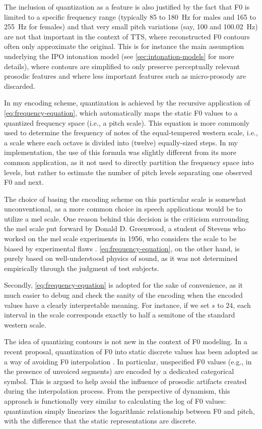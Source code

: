 The inclusion of quantization as a feature is also justified by the fact that \ac{F0} is limited to a specific frequency range (typically 85 to 180~Hz for males and 165 to 255~Hz for females) and that very small pitch variations (say, 100 and 100.02~Hz) are not that important in the context of \ac{TTS}, where reconstructed \ac{F0} contours often only approximate the original.
This is for instance the main assumption underlying the IPO intonation model (see \autoref{sec:intonation-models} for more details), where contours are simplified to only preserve perceptually relevant prosodic features and where less important features such as micro-prosody are discarded.

In my encoding scheme, quantization is achieved by the recursive application of \autoref{eq:frequency-equation}, which automatically maps the static \ac{F0} values to a quantized frequency space (i.e., a pitch scale).
This equation is more commonly used to determine the frequency of notes of the equal-tempered western scale, i.e., a scale where each octave is divided into (twelve) equally-sized steps.
In my implementation, the use of this formula was slightly different from its more common application, as it not used to directly partition the frequency space into levels, but rather to estimate the number of pitch levels separating one observed \ac{F0} and next.

The choice of basing the encoding scheme on this particular scale is somewhat unconventional, as a more common choice in speech applications would be to utilize a mel scale.
One reason behind this decision is the criticism surrounding the mel scale put forward by Donald D. Greenwood, a student of Stevens who worked on the mel scale experiments in 1956, who considers the scale to be biased by experimental flaws \citep{Greenwood1997Mel}.
\autoref{eq:frequency-equation}, on the other hand, is purely based on well-understood physics of sound, as it was not determined empirically through the judgment of test subjects.

Secondly, \autoref{eq:frequency-equation} is adopted for the sake of convenience, as it much easier to debug and check the sanity of the encoding when the encoded values have a clearly interpretable meaning.
For instance, if we set $s$ to $24$, each interval in the scale corresponds exactly to half a semitone of the standard western scale.

The idea of quantizing contours is not new in the context of \ac{F0} modeling. 
In a recent proposal, quantization of \ac{F0} into static discrete values has been adopted as a way of avoiding \ac{F0} interpolation \citep{Wang2017RNN}.
In particular, unspecified \ac{F0} values (e.g., in the presence of unvoiced segments) are encoded by a dedicated categorical symbol.
This is argued to help avoid the influence of prosodic artifacts created during the interpolation process.
From the perspective of dynamism, this approach is functionally very similar to calculating the log of \ac{F0} values: quantization simply linearizes the logarithmic relationship between \ac{F0} and pitch, with the difference that the static representations are discrete.

